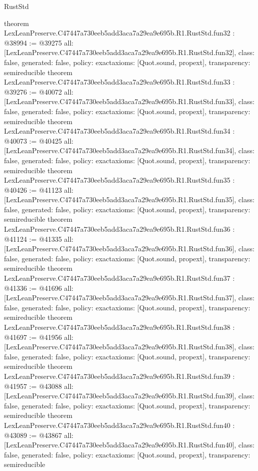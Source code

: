 \begin{lexlean}{RustStd}
\begin{coremodule}
{}
theorem LexLeanPreserve.C47447a730eeb5add3aca7a29ea9e695b.R1.RustStd.fun32 : @38994 := @39275 {
  all: [LexLeanPreserve.C47447a730eeb5add3aca7a29ea9e695b.R1.RustStd.fun32],
  class: false,
  generated: false,
  policy: exact{axioms: [Quot.sound, propext]},
  transparency: semireducible
}
theorem LexLeanPreserve.C47447a730eeb5add3aca7a29ea9e695b.R1.RustStd.fun33 : @39276 := @40072 {
  all: [LexLeanPreserve.C47447a730eeb5add3aca7a29ea9e695b.R1.RustStd.fun33],
  class: false,
  generated: false,
  policy: exact{axioms: [Quot.sound, propext]},
  transparency: semireducible
}
theorem LexLeanPreserve.C47447a730eeb5add3aca7a29ea9e695b.R1.RustStd.fun34 : @40073 := @40425 {
  all: [LexLeanPreserve.C47447a730eeb5add3aca7a29ea9e695b.R1.RustStd.fun34],
  class: false,
  generated: false,
  policy: exact{axioms: [Quot.sound, propext]},
  transparency: semireducible
}
theorem LexLeanPreserve.C47447a730eeb5add3aca7a29ea9e695b.R1.RustStd.fun35 : @40426 := @41123 {
  all: [LexLeanPreserve.C47447a730eeb5add3aca7a29ea9e695b.R1.RustStd.fun35],
  class: false,
  generated: false,
  policy: exact{axioms: [Quot.sound, propext]},
  transparency: semireducible
}
theorem LexLeanPreserve.C47447a730eeb5add3aca7a29ea9e695b.R1.RustStd.fun36 : @41124 := @41335 {
  all: [LexLeanPreserve.C47447a730eeb5add3aca7a29ea9e695b.R1.RustStd.fun36],
  class: false,
  generated: false,
  policy: exact{axioms: [Quot.sound, propext]},
  transparency: semireducible
}
theorem LexLeanPreserve.C47447a730eeb5add3aca7a29ea9e695b.R1.RustStd.fun37 : @41336 := @41696 {
  all: [LexLeanPreserve.C47447a730eeb5add3aca7a29ea9e695b.R1.RustStd.fun37],
  class: false,
  generated: false,
  policy: exact{axioms: [Quot.sound, propext]},
  transparency: semireducible
}
theorem LexLeanPreserve.C47447a730eeb5add3aca7a29ea9e695b.R1.RustStd.fun38 : @41697 := @41956 {
  all: [LexLeanPreserve.C47447a730eeb5add3aca7a29ea9e695b.R1.RustStd.fun38],
  class: false,
  generated: false,
  policy: exact{axioms: [Quot.sound, propext]},
  transparency: semireducible
}
theorem LexLeanPreserve.C47447a730eeb5add3aca7a29ea9e695b.R1.RustStd.fun39 : @41957 := @43088 {
  all: [LexLeanPreserve.C47447a730eeb5add3aca7a29ea9e695b.R1.RustStd.fun39],
  class: false,
  generated: false,
  policy: exact{axioms: [Quot.sound, propext]},
  transparency: semireducible
}
theorem LexLeanPreserve.C47447a730eeb5add3aca7a29ea9e695b.R1.RustStd.fun40 : @43089 := @43867 {
  all: [LexLeanPreserve.C47447a730eeb5add3aca7a29ea9e695b.R1.RustStd.fun40],
  class: false,
  generated: false,
  policy: exact{axioms: [Quot.sound, propext]},
  transparency: semireducible
}
\end{coremodule}
\end{lexlean}
